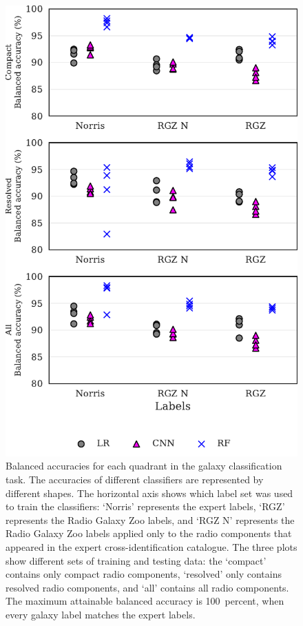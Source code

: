 \documentclass[fleqn,usenatbib,usedcolumn]{mnras}
\begin{document}
  \begin{figure}
  \centering
  \includegraphics[width=\columnwidth]{images/cdfs_ba_grid.pdf}
  \caption{Balanced accuracies for each quadrant in the galaxy
    classification task. The accuracies of different classifiers are represented
    by different shapes. The horizontal axis shows which label set was used to
    train the classifiers: `Norris' represents the expert labels, `RGZ'
    represents the Radio Galaxy Zoo labels, and `RGZ N' represents the Radio
    Galaxy Zoo labels applied only to the radio components that appeared in the
    expert cross-identification catalogue. The three plots show different sets
    of training and testing data: the `compact' contains only compact radio
    components, `resolved' only contains resolved radio components, and `all'
    contains all radio components. The maximum attainable balanced accuracy is
    100~percent, when every galaxy label matches the expert labels.
    \label{fig:ba}}
  \end{figure}
\end{document}
